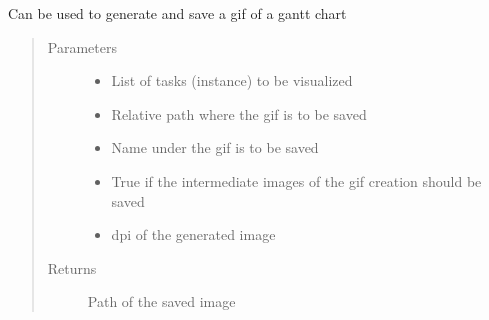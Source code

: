 \documentclass[letterpaper,10pt,english]{sphinxmanual}
\begin{document}
\begin{fulllineitems}
\begin{fulllineitems}
\label{\detokenize{visuals_generator:visuals_generator.gantt_chart.GanttChartPlotter.get_gantt_chart_gif_and_save}}
\sphinxAtStartPar
Can be used to generate and save a gif of a gantt chart
\begin{quote}\begin{description}
\item[{Parameters}] \leavevmode\begin{itemize}
\item {} 
\sphinxAtStartPar
{} \textendash{} List of tasks (instance) to be visualized

\item {} 
\sphinxAtStartPar
{} \textendash{} Relative path where the gif is to be saved

\item {} 
\sphinxAtStartPar
{} \textendash{} Name under the gif is to be saved

\item {} 
\sphinxAtStartPar
{} \textendash{} True if the intermediate images of the gif creation should be saved

\item {} 
\sphinxAtStartPar
{} \textendash{} dpi of the generated image

\end{itemize}

\item[{Returns}] \leavevmode
\sphinxAtStartPar
Path of the saved image

\end{description}\end{quote}

\end{fulllineitems}


\end{fulllineitems}
\end{document}
